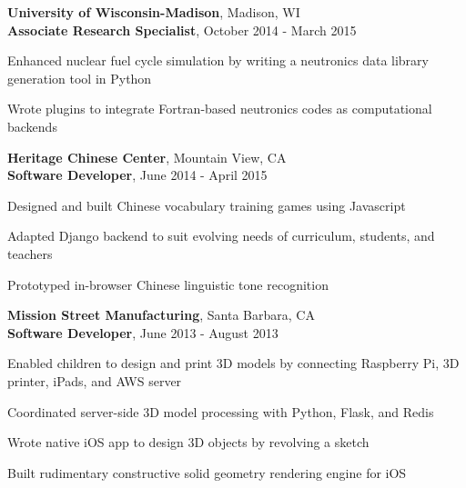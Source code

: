 \textbf{University of Wisconsin-Madison}, Madison, WI \\
\textbf{Associate Research Specialist}, October 2014 - March 2015
\begin{tightlist}

  \item Enhanced nuclear fuel cycle simulation by writing a neutronics
  data library generation tool in Python

  \item Wrote plugins to integrate Fortran-based neutronics codes as
  computational backends

\end{tightlist}
\textbf{Heritage Chinese Center}, Mountain View, CA \\
\textbf{Software Developer}, June 2014 - April 2015
\begin{tightlist}

  \item Designed and built Chinese vocabulary training games using
  Javascript

  \item Adapted Django backend to suit evolving needs of curriculum,
  students, and teachers

  \item Prototyped in-browser Chinese linguistic tone recognition



\end{tightlist}
\textbf{Mission Street Manufacturing}, Santa Barbara, CA \\
\textbf{Software Developer}, June 2013 - August 2013
\begin{tightlist}

  \item Enabled children to design and print 3D models by connecting
  Raspberry Pi, 3D printer, iPads, and AWS server

  \item Coordinated server-side 3D model processing with Python,
  Flask, and Redis

  \item Wrote native iOS app to design 3D objects by revolving a sketch

  \item Built rudimentary constructive solid geometry rendering engine for iOS

\end{tightlist}
